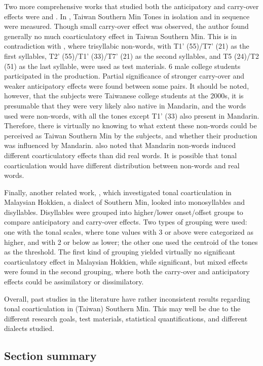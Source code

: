 \documentclass[12pt]{report}
\begin{document}
\begin{CJK}{UTF8}{bsmi}
Two more comprehensive works that studied both the anticipatory and carry-over effects were \cite{Lin1988} and \cite{Wang2002}. In \cite{Lin1988}, Taiwan Southern Min Tones in isolation and in sequence were measured. Though small carry-over effect was observed, the author found generally no much coarticulatory effect in Taiwan Southern Min. This is in contradiction with \cite{Wang2002}, where trisyllabic non-words, with T1' (55)/T7' (21) as the first syllables, T2' (55)/T1' (33)/T7' (21) as the second syllables, and T5 (24)/T2 (51) as the last syllable, were used as test materials. 6 male college students participated in the production. Partial significance of stronger carry-over and weaker anticipatory effects were found between some pairs. It should be noted, however, that the subjects were Taiwanese college students at the 2000s, it is presumable that they were very likely also native in Mandarin, and the words used were non-words, with all the tones except T1' (33) also present in Mandarin. Therefore, there is virtually no knowing to what extent these non-words could be perceived as Taiwan Southern Min by the subjects, and whether their production was influenced by Mandarin. \cite{ShihSproat1992} also noted that Mandarin non-words induced different coarticulatory effects than did real words. It is possible that tonal coarticulation would have different distribution between non-words and real words.

Finally, another related work, \cite{ChangHsieh2012}, which investigated tonal coarticulation in Malaysian Hokkien, a dialect of Southern Min, looked into monosyllables and disyllables. Disyllables were grouped into higher/lower onset/offset groups to compare anticipatory and carry-over effects. Two types of grouping were used: one with the tonal scales, where tone values with 3 or above were categorized as higher, and with 2 or below as lower; the other one used the centroid of the tones as the threshold. The first kind of grouping yielded virtually no significant coarticulatory effect in Malaysian Hokkien, while significant, but mixed effects were found in the second grouping, where both the carry-over and anticipatory effects could be assimilatory or dissimilatory.

Overall, past studies in the literature have rather inconsistent results regarding tonal coarticulation in (Taiwan) Southern Min. This may well be due to the different research goals, test materials, statistical quantifications, and different dialects studied.

\subsection{Section summary}


\end{CJK}
\end{document}
